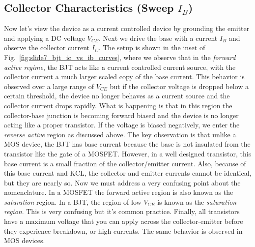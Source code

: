 \subsection{Collector Characteristics \texorpdfstring{(Sweep $I_B$)}{}}
Now let's view the device as a current controlled device by grounding the emitter and applying a DC voltage $V_{CE}$.  Next we drive the base with a current $I_B$ and observe the collector current $I_C$.  The setup is shown in the inset of Fig.~\ref{fig:slide7_bjt_ic_vs_ib_curves}, where we observe that in the \emph{forward active regime}, the BJT acts like a current controlled current source, with the collector current a much larger scaled copy of the base current.  This behavior is observed over a large range of $V_{CE}$ but if the collector voltage is dropped below a certain threshold, the device no longer behaves as a current source and the collector current drops rapidly.  What is happening is that in this region the collector-base junction is becoming forward biased and the device is no longer acting like a proper transistor. If the voltage is biased negatively, we enter the \emph{reverse active} region as discussed above.
The key observation is that unlike a MOS device, the BJT has base current because the base is not insulated from the transistor like the gate of a MOSFET.  However, in a well designed transistor, this base current is a small fraction of the collector/emitter current.  Also, because of this base current and KCL, the collector and emitter currents cannot be identical, but they are nearly so.
Now we must address a very confusing point about the nomenclature.  In a MOSFET the forward active region is also known as the \emph{saturation} region.  In a BJT, the region of low $V_{CE}$ is known as the \emph{saturation region}.  This is very confusing but it's common practice.
Finally, all transistors have a maximum voltage that you can apply across the collector-emitter before they experience breakdown, or high currents.  The same behavior is observed in MOS devices.  
